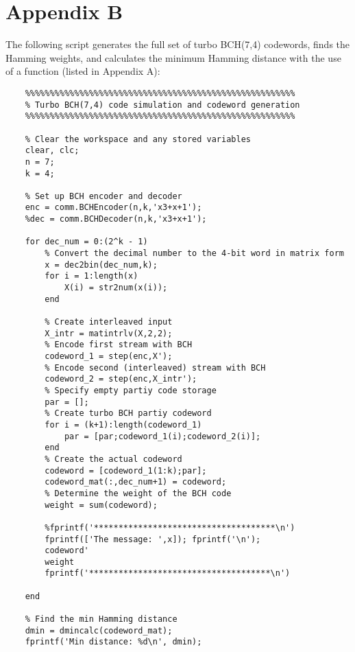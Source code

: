 \documentclass{article}
\begin{document}
\newpage

\section{Appendix B}
The following script generates the full set of turbo BCH(7,4) codewords, finds the Hamming weights, and calculates the minimum Hamming distance with the use of a function (listed in Appendix A):
\begin{lstlisting}
	%%%%%%%%%%%%%%%%%%%%%%%%%%%%%%%%%%%%%%%%%%%%%%%%%%%%%%%
	% Turbo BCH(7,4) code simulation and codeword generation
	%%%%%%%%%%%%%%%%%%%%%%%%%%%%%%%%%%%%%%%%%%%%%%%%%%%%%%%
	
	% Clear the workspace and any stored variables
	clear, clc;
	n = 7;
	k = 4;
	
	% Set up BCH encoder and decoder
	enc = comm.BCHEncoder(n,k,'x3+x+1');
	%dec = comm.BCHDecoder(n,k,'x3+x+1');
	
	for dec_num = 0:(2^k - 1)
		% Convert the decimal number to the 4-bit word in matrix form
		x = dec2bin(dec_num,k);
		for i = 1:length(x)
			X(i) = str2num(x(i));
		end
	
		% Create interleaved input
		X_intr = matintrlv(X,2,2);
		% Encode first stream with BCH
		codeword_1 = step(enc,X');
		% Encode second (interleaved) stream with BCH
		codeword_2 = step(enc,X_intr');
		% Specify empty partiy code storage
		par = [];
		% Create turbo BCH partiy codeword
		for i = (k+1):length(codeword_1)
			par = [par;codeword_1(i);codeword_2(i)];
		end
		% Create the actual codeword
		codeword = [codeword_1(1:k);par];
		codeword_mat(:,dec_num+1) = codeword;
		% Determine the weight of the BCH code
		weight = sum(codeword);
	
		%fprintf('*************************************\n')
		fprintf(['The message: ',x]); fprintf('\n');
		codeword'
		weight
		fprintf('*************************************\n')
	
	end
	
	% Find the min Hamming distance
	dmin = dmincalc(codeword_mat);
	fprintf('Min distance: %d\n', dmin);
\end{lstlisting}
\end{document}
